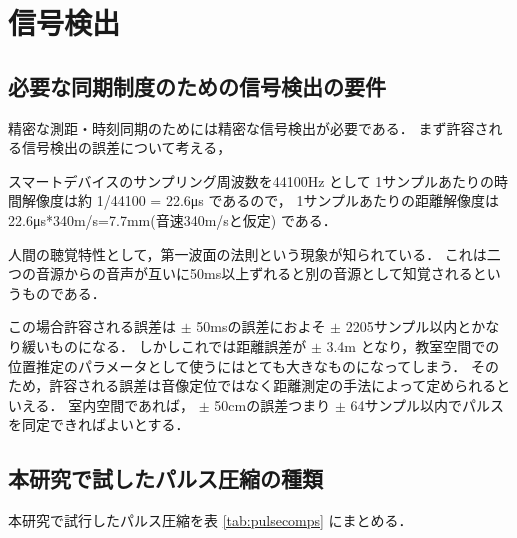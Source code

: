 
\section{信号検出}

\subsection{必要な同期制度のための信号検出の要件}

精密な測距・時刻同期のためには精密な信号検出が必要である．
まず許容される信号検出の誤差について考える，

スマートデバイスのサンプリング周波数を44100Hz
として
1サンプルあたりの時間解像度は約 1/44100 = 22.6μs
であるので，
1サンプルあたりの距離解像度は 22.6μs*340m/s=7.7mm(音速340m/sと仮定)
である．

人間の聴覚特性として，第一波面の法則という現象が知られている\cite{Haas}．
これは二つの音源からの音声が互いに50ms以上ずれると別の音源として知覚されるというものである．

この場合許容される誤差は
$\pm$ 50msの誤差におよそ $\pm$ 2205サンプル以内とかなり緩いものになる．
しかしこれでは距離誤差が $\pm$ 3.4m となり，教室空間での位置推定のパラメータとして使うにはとても大きなものになってしまう．
そのため，許容される誤差は音像定位ではなく距離測定の手法によって定められるといえる．
室内空間であれば，
$\pm$ 50cmの誤差つまり $\pm$ 64サンプル以内でパルスを同定できればよいとする．


\subsection{本研究で試したパルス圧縮の種類}

本研究で試行したパルス圧縮を表 \ref{tab:pulsecomps} にまとめる．

